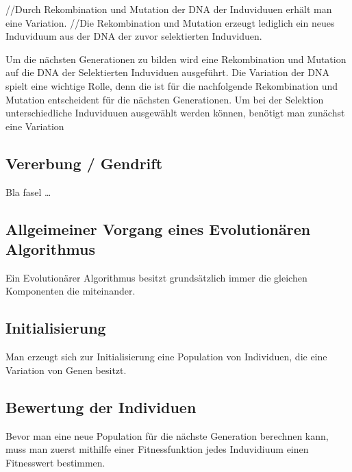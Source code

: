 //Durch Rekombination und Mutation der DNA der Induviduuen erhält man eine Variation. 
//Die Rekombination und Mutation erzeugt lediglich ein neues Induviduum aus der DNA der zuvor selektierten Induviduen.

Um die nächsten Generationen zu bilden wird eine Rekombination und Mutation auf die DNA der Selektierten Induviduen ausgeführt. 
Die Variation der DNA  spielt eine wichtige Rolle, denn die ist für die nachfolgende Rekombination und Mutation entscheident für die nächsten Generationen. 
Um bei der Selektion unterschiedliche Induviduuen ausgewählt werden können, benötigt man zunächst eine Variation 

\subsection{Vererbung / Gendrift}
\label{ch:Grundlagen:sec:Taktile Geräte:subsec:Variation}
Bla fasel \dots

\subsection{Allgeimeiner Vorgang eines Evolutionären Algorithmus}
\label{ch:Grundlagen:sec:Taktile Geräte:sec:Allgeimeiner Vorgang eines Evolutionären Algorithmus}
Ein Evolutionärer Algorithmus besitzt grundsätzlich immer die gleichen Komponenten die miteinander.

\subsection{Initialisierung}
\label{ch:Grundlagen:sec:Initialisierung}
Man erzeugt sich zur Initialisierung eine Population von Individuen, die eine Variation von Genen besitzt. 

\subsection{Bewertung der Individuen}
\label{ch:Grundlagen:sec:Bewertung der Individuen}
Bevor man eine neue Population für die nächste Generation berechnen kann, muss man zuerst mithilfe einer Fitnessfunktion jedes Induvidiuum einen Fitnesswert bestimmen. 

